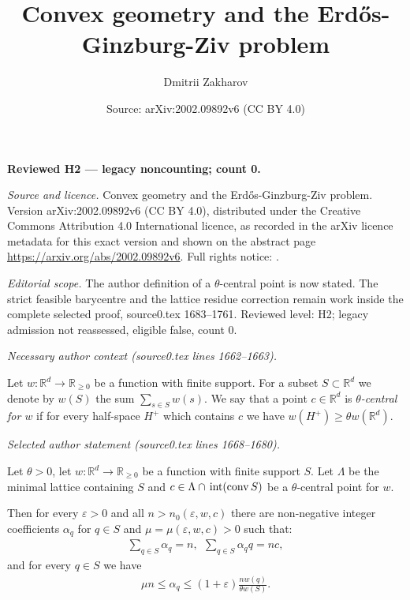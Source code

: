 \documentclass[10pt,a4paper]{amsart}
\title[103349: source reading]{Convex geometry and the Erd\H{o}s-Ginzburg-Ziv problem}
\author{Dmitrii Zakharov}
\date{Source: arXiv:2002.09892v6 (CC BY 4.0)}
\newcommand{\R}{\mathbb R}
\newcommand{\conv}{{\rm conv}\,}
\renewcommand{\ge}{\geqslant}
\renewcommand{\le}{\leqslant}
\begin{document}
\maketitle
\noindent\textbf{Reviewed H2 --- legacy noncounting; count 0.}\par\smallskip
{\raggedright \noindent\emph{Source and licence.} Convex geometry and the Erd\H{o}s-Ginzburg-Ziv problem. Version arXiv:2002.09892v6 (CC BY 4.0), distributed under the Creative Commons Attribution 4.0 International licence, as recorded in the arXiv licence metadata for this exact version and shown on the abstract page \url{https://arxiv.org/abs/2002.09892v6}. Full rights notice: .\par\smallskip\par}

\noindent\textit{Editorial scope.} The author definition of a $\theta$-central point is now stated. The strict feasible barycentre and the lattice residue correction remain work inside the complete selected proof, source0.tex 1683--1761. Reviewed level: H2; legacy admission not reassessed, eligible false, count 0.\par\smallskip

\par\medskip\noindent\textit{Necessary author context (source0.tex lines 1662--1663).}\par\smallskip
Let $w: \R^d \rightarrow \R_{\ge 0}$ be a function with finite support. For a subset $S \subset \R^d$ we denote by $w(S)$ the sum $\sum_{s \in S} w(s)$.
We say that a point $c \in \R^d$ is {\em $\theta$-central for $w$} if for every half-space $H^+$ which contains $c$ we have $w(H^+) \ge \theta w(\R^d)$.

\par\medskip\noindent\textit{Selected author statement (source0.tex lines 1668--1680).}\par\smallskip
\begin{lemma}\label{lm2}
Let $\theta > 0$, let $w: \R^d \rightarrow \R_{\ge 0}$ be a function with finite support $S$. 
Let $\Lambda$ be the minimal lattice containing $S$ and $c \in \Lambda \cap \,{\rm int}(\conv{S})$ be a $\theta$-central point for $w$.

Then for every $\varepsilon > 0$ and all $n > n_0(\varepsilon, w, c)$ there are non-negative integer coefficients $\alpha_q$ for $q \in S$ and $\mu = \mu(\varepsilon, w, c) > 0$ such that:
\begin{align}\label{eqlm}
    \sum_{q \in S} \alpha_q = n,~~    \sum_{q \in S} \alpha_q q = n c, 
\end{align}
and for every $q\in S$ we have 
\begin{align}\label{eqlm2}
    \mu n \le \alpha_q \le  (1 + \varepsilon) \frac{n w(q)}{\theta w(S)}.
\end{align}
\end{lemma}
\end{document}
